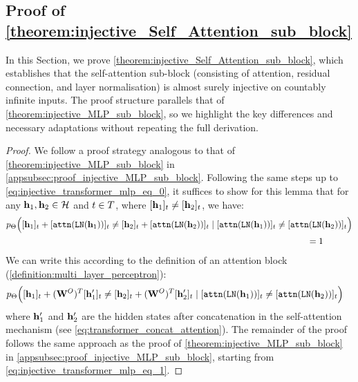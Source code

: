 \subsection{\texorpdfstring{Proof of \cref{theorem:injective_Self_Attention_sub_block}}{Theorem}}\label{appsubsec:proof_injective_Self_Attention_sub_block}
In this Section, we prove \cref{theorem:injective_Self_Attention_sub_block}, which establishes that the self-attention sub-block (consisting of attention, residual connection, and layer normalisation) is almost surely injective on countably infinite inputs. The proof structure parallels that of \cref{theorem:injective_MLP_sub_block}, so we highlight the key differences and necessary adaptations without repeating the full derivation.
\injectiveSelfAttentionsubblock* 
\begin{proof}
   We follow a proof strategy analogous to that of \cref{theorem:injective_MLP_sub_block} in \cref{appsubsec:proof_injective_MLP_sub_block}. Following the same steps up to \cref{eq:injective_transformer_mlp_eq_0}, it suffices to show for this lemma that  for any $\mathbf{h}_1,\mathbf{h}_2\in\mathcal{H}$ and $t\in T$, where $[\mathbf{h}_1]_t\neq[\mathbf{h}_2]_t$, we have:
    \begin{align}
        &p_{\Theta}\Big([\mathbf{h}_1]_t+[\mathtt{attn}(\mathtt{LN}(\mathbf{h}_1))]_t\neq[\mathbf{h}_2]_t+[\mathtt{attn}(\mathtt{LN}(\mathbf{h}_2))]_t \mid  [\mathtt{attn}(\mathtt{LN}(\mathbf{h}_1))]_t\neq[\mathtt{attn}(\mathtt{LN}(\mathbf{h}_2))]_t\Big) \nonumber \\
        &\qquad\qquad\qquad\qquad\qquad\qquad\qquad\qquad\qquad\qquad\qquad\qquad\qquad\qquad\qquad\qquad\qquad =1 
    \end{align}
    We can write this according to the definition of an attention block (\cref{definition:multi_layer_perceptron}):
    \begin{align}
        &p_{\Theta}\Big([\mathbf{h}_1]_t+(\mathbf{W}^O)^T[\mathbf{h}'_1]_t\neq[\mathbf{h}_2]_t+(\mathbf{W}^O)^T[\mathbf{h}'_2]_t \mid [\mathtt{attn}(\mathtt{LN}(\mathbf{h}_1))]_t\neq[\mathtt{attn}(\mathtt{LN}(\mathbf{h}_2))]_t\Big)
    \end{align}
    where $\mathbf{h}'_1$ and $\mathbf{h}'_2$ are the hidden states after concatenation in the self-attention mechanism (see \cref{eq:transformer_concat_attention}). The remainder of the proof follows the same approach as the proof of \cref{theorem:injective_MLP_sub_block} in \cref{appsubsec:proof_injective_MLP_sub_block}, starting from \cref{eq:injective_transformer_mlp_eq_1}.
\end{proof}

